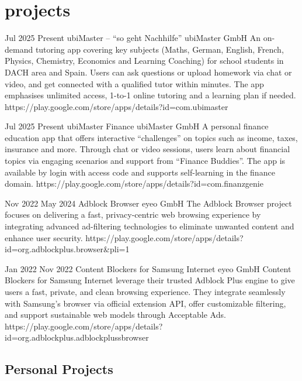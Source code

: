\documentclass[a4paper,nocolors]{friggeri-cv}
\begin{document}
\section{projects}
\begin{entrylist}

\entryproject
{Jul 2025}
{Present}
{ubiMaster – “so geht Nachhilfe”}
{ubiMaster GmbH}
{
  An on-demand tutoring app covering key subjects (Maths, German, English, French, Physics, Chemistry, Economics and Learning Coaching) for school students in DACH area and Spain. Users can ask questions or upload homework via chat or video, and get connected with a qualified tutor within minutes. The app emphasises unlimited access, 1-to-1 online tutoring and a learning plan if needed. 
}
{https://play.google.com/store/apps/details?id=com.ubimaster}

\entryproject
{Jul 2025}
{Present}
{ubiMaster Finance}
{ubiMaster GmbH}
{
  A personal finance education app that offers interactive “challenges” on topics such as income, taxes, insurance and more. Through chat or video sessions, users learn about financial topics via engaging scenarios and support from “Finance Buddies”. The app is available by login with access code and supports self-learning in the finance domain. 
}
{https://play.google.com/store/apps/details?id=com.finanzgenie}

\entryproject
{Nov 2022}
{May 2024}
{Adblock Browser}
{eyeo GmbH}
{
  The Adblock Browser project focuses on delivering a fast, privacy-centric web
  browsing experience by integrating advanced ad-filtering technologies to eliminate
  unwanted content and enhance user security.
}
{https://play.google.com/store/apps/details?id=org.adblockplus.browser&pli=1}

\entryproject
{Jan 2022}
{Nov 2022}
{Content Blockers for Samsung Internet}
{eyeo GmbH}
{
  Content Blockers for Samsung Internet leverage their trusted Adblock Plus engine to give users a fast, private, and clean browsing experience. They integrate seamlessly with Samsung’s browser via official extension API, offer customizable filtering, and support sustainable web models through Acceptable Ads.
}
{https://play.google.com/store/apps/details?id=org.adblockplus.adblockplussbrowser}

\end{entrylist} 

\subsection{Personal Projects}
\end{document}
